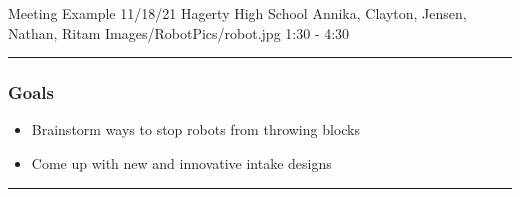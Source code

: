 \insertmeeting 
	{Meeting Example} 
	{11/18/21}
	{Hagerty High School}
	{Annika, Clayton, Jensen, Nathan, Ritam}
	{Images/RobotPics/robot.jpg}
	{1:30 - 4:30}
	
\noindent\hfil\rule{\textwidth}{.4pt}\hfil
\subsubsection*{Goals}
\begin{itemize}
    \item Brainstorm ways to stop robots from throwing blocks
    \item Come up with new and innovative intake designs


\end{itemize} 

\noindent\hfil\rule{\textwidth}{.4pt}\hfil

